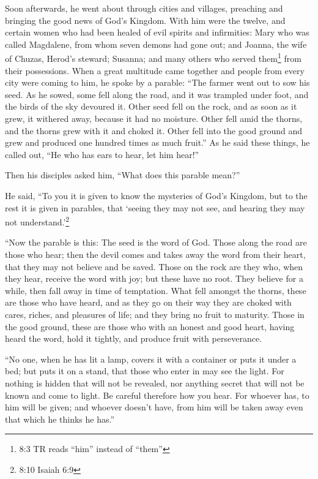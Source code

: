  Soon afterwards, he went about through cities and villages,
preaching and bringing the good news of God's Kingdom. With him were the
twelve,  and certain women who had been healed of evil
spirits and infirmities: Mary who was called Magdalene, from whom seven
demons had gone out;  and Joanna, the wife of Chuzas,
Herod's steward; Susanna; and many others who served them\footnote{8:3
  TR reads ``him'' instead of ``them''} from their possessions.
 When a great multitude came together and people from every
city were coming to him, he spoke by a parable:  ``The
farmer went out to sow his seed. As he sowed, some fell along the road,
and it was trampled under foot, and the birds of the sky devoured it.
 Other seed fell on the rock, and as soon as it grew, it
withered away, because it had no moisture.  Other fell amid
the thorns, and the thorns grew with it and choked it. 
Other fell into the good ground and grew and produced one hundred times
as much fruit.'' As he said these things, he called out, ``He who has
ears to hear, let him hear!''

 Then his disciples asked him, ``What does this parable
mean?''

 He said, ``To you it is given to know the mysteries of
God's Kingdom, but to the rest it is given in parables, that `seeing
they may not see, and hearing they may not understand.'\footnote{8:10
  Isaiah 6:9}

 ``Now the parable is this: The seed is the word of God.
 Those along the road are those who hear; then the devil
comes and takes away the word from their heart, that they may not
believe and be saved.  Those on the rock are they who, when
they hear, receive the word with joy; but these have no root. They
believe for a while, then fall away in time of temptation. 
What fell amongst the thorns, these are those who have heard, and as
they go on their way they are choked with cares, riches, and pleasures
of life; and they bring no fruit to maturity.  Those in the
good ground, these are those who with an honest and good heart, having
heard the word, hold it tightly, and produce fruit with perseverance.

 ``No one, when he has lit a lamp, covers it with a
container or puts it under a bed; but puts it on a stand, that those who
enter in may see the light.  For nothing is hidden that
will not be revealed, nor anything secret that will not be known and
come to light.  Be careful therefore how you hear. For
whoever has, to him will be given; and whoever doesn't have, from him
will be taken away even that which he thinks he has.''

